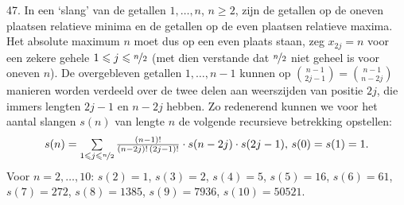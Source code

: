 \begin{problem}{47.}
	In een `slang' van de getallen $1,\dotsc,n$, $n \geq 2$, zijn de getallen op de oneven plaatsen relatieve minima en de getallen op de even plaatsen relatieve maxima. Het absolute maximum $n$ moet dus op een even plaats staan, zeg $x_{2j} = n$ voor een zekere gehele $1 \leq j \leq \nicefrac{n}{2}$ (met dien verstande dat $\nicefrac{n}{2}$ niet geheel is voor oneven $n$). De overgebleven getallen $1,\dotsc,n - 1$ kunnen op $\binom{n - 1}{2j - 1} = \binom{n - 1}{n - 2j}$ manieren worden verdeeld over de twee delen aan weerszijden van positie $2j$, die immers lengten $2j - 1$ en $n - 2j$ hebben. Zo redenerend kunnen we voor het aantal slangen $s(n)$ van lengte $n$ de volgende recursieve betrekking opstellen:
    \begin{equation*}
        s(n) = \textstyle\sum\limits_{1 \leq j \leq \nicefrac{n}{2}} \frac{(n - 1)!}{(n - 2j)!\, (2j - 1)!} \cdot s(n - 2j) \cdot s(2j - 1),\, s(0) = s(1) = 1.
    \end{equation*}
    Voor $n = 2,\dotsc,10$: $s(2) = 1$, $s(3) = 2$, $s(4) = 5$, $s(5) = 16$, $s(6) = 61$, $s(7) = 272$, $s(8) = 1385$, $s(9) = 7936$, $s(10) = 50521$.
\end{problem}

\clearpage

